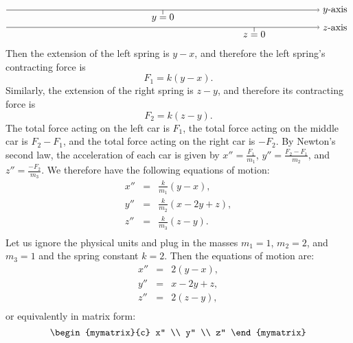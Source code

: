 \begin{solution}
\begin{equation*}
\begin{tikzpicture}[scale=0.8, color=blue!50!black]
\begin{scope}[yshift=-0.5cm, color=black]
      \end{scope}
      \begin{scope}[yshift=-1.3cm, color=black]
        \draw[->] (0,0) -- (14.4,0) node[right] {$y$-axis};
        \draw (7.2,0) -- +(0,-0.2) node[below=-4pt] {$y=0$};
      \end{scope}
      \begin{scope}[yshift=-2.1cm, color=black]
        \draw[->] (0,0) -- (14.4,0) node[right] {$z$-axis};
        \draw (11.4,0) -- +(0,-0.2) node[below=-4pt] {$z=0$};
      \end{scope}
    \end{tikzpicture}
  \end{equation*}
  Then the extension of the left spring is $y-x$, and therefore the
  left spring's contracting force is
  \begin{equation*}
    F_1 = k(y-x).
  \end{equation*}
  Similarly, the extension of the right spring is $z-y$, and therefore
  its contracting force is
  \begin{equation*}
    F_2 = k(z-y).
  \end{equation*}
  The total force acting on the left car is $F_1$, the total force
  acting on the middle car is $F_2-F_1$, and the total force acting on
  the right car is $-F_2$. By Newton's second law, the acceleration
  of each car is given by $x'' = \frac{F_1}{m_1}$,
  $y'' = \frac{F_2-F_1}{m_2}$, and $z''=\frac{-F_2}{m_3}$. We
  therefore have the following equations of motion:
  \begin{eqnarray*}
    x'' &=& \frac{k}{m_1}(y-x), \\
    y'' &=& \frac{k}{m_2}(x-2y+z), \\
    z'' &=& \frac{k}{m_3}(z-y). \\
  \end{eqnarray*}
  Let us ignore the physical units and plug in the masses $m_1=1$,
  $m_2=2$, and $m_3=1$ and the spring constant $k=2$. Then the equations
  of motion are:
  \begin{eqnarray*}
    x'' &=& 2(y-x), \\
    y'' &=& x-2y+z, \\
    z'' &=& 2(z-y), \\
  \end{eqnarray*}
  or equivalently in matrix form:
  \begin{equation*}
    \begin{mymatrix}{c} x'' \\ y'' \\ z'' \end{mymatrix}

\end{equation*}
\end{solution}
